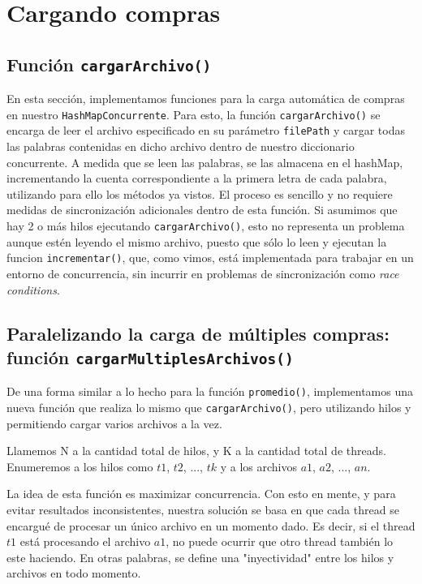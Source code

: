 \documentclass[a4paper]{article}
\begin{document}
    \section{Cargando compras}

    \subsection{Función \texttt{cargarArchivo()}}

    En esta sección, implementamos funciones para la carga automática de compras en nuestro \texttt{HashMapConcurrente}. Para esto, la función \texttt{cargarArchivo()} se encarga de leer el archivo especificado en su parámetro \texttt{filePath} y cargar todas las palabras contenidas en dicho archivo dentro de nuestro diccionario concurrente. A medida que se leen las palabras, se las almacena en el hashMap, incrementando la cuenta correspondiente a la primera letra de cada palabra, utilizando para ello los métodos ya vistos. El proceso es sencillo y no requiere medidas de sincronización adicionales dentro de esta función. Si asumimos que hay 2 o más hilos ejecutando \texttt{cargarArchivo()}, esto no representa un problema aunque estén leyendo el mismo archivo, puesto que sólo lo leen y ejecutan la funcion \texttt{incrementar()}, que, como vimos, está implementada para trabajar en un entorno de concurrencia, sin incurrir en problemas de sincronización como \textit{race conditions}.

    \subsection{Paralelizando la carga de múltiples compras: función \texttt{cargarMultiplesArchivos()}}

    De una forma similar a lo hecho para la función \texttt{promedio()}, implementamos una nueva función que realiza lo mismo que \texttt{cargarArchivo()}, pero utilizando hilos y permitiendo cargar varios archivos a la vez.

    Llamemos N a la cantidad total de hilos, y K a la cantidad total de threads. Enumeremos a los hilos como $t1$, $t2$, ..., $tk$ y a los archivos $a1$, $a2$, ..., $an$.

    La idea de esta función es maximizar concurrencia. Con esto en mente, y para evitar resultados inconsistentes, nuestra solución se basa en que cada thread se encargué de procesar un único archivo en un momento dado. Es decir, si el thread $t1$ está procesando el archivo $a1$, no puede ocurrir que otro thread también lo este haciendo. En otras palabras, se define una "inyectividad" entre los hilos y archivos en todo momento.
\end{document}
